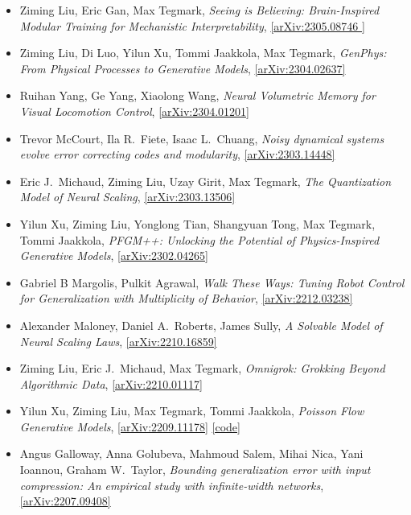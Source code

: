 \begin{itemize}
\item Ziming Liu, Eric Gan, Max Tegmark, \textit{Seeing is Believing: Brain-Inspired Modular Training for Mechanistic Interpretability}, \href{https://arxiv.org/abs/2305.08746 }{[arXiv:2305.08746 ]} 
\item Ziming Liu, Di Luo, Yilun Xu, Tommi Jaakkola, Max Tegmark, \textit{GenPhys: From Physical Processes to Generative Models}, \href{https://arxiv.org/abs/2304.02637}{[arXiv:2304.02637]} 
\item Ruihan Yang, Ge Yang, Xiaolong Wang, \textit{Neural Volumetric Memory for Visual Locomotion Control}, \href{https://arxiv.org/abs/2304.01201}{[arXiv:2304.01201]} 
\item Trevor McCourt, Ila R.\  Fiete, Isaac L.\  Chuang, \textit{Noisy dynamical systems evolve error correcting codes and modularity}, \href{https://arxiv.org/abs/2303.14448}{[arXiv:2303.14448]} 
\item Eric J.\  Michaud, Ziming Liu, Uzay Girit, Max Tegmark, \textit{The Quantization Model of Neural Scaling}, \href{https://arxiv.org/abs/2303.13506}{[arXiv:2303.13506]} 
\item Yilun Xu, Ziming Liu, Yonglong Tian, Shangyuan Tong, Max Tegmark, Tommi Jaakkola, \textit{PFGM++: Unlocking the Potential of Physics-Inspired Generative Models}, \href{https://arxiv.org/abs/2302.04265}{[arXiv:2302.04265]} 
\item Gabriel B Margolis, Pulkit Agrawal, \textit{Walk These Ways: Tuning Robot Control for Generalization with Multiplicity of Behavior}, \href{https://arxiv.org/abs/2212.03238}{[arXiv:2212.03238]} 
\item Alexander Maloney, Daniel A.\  Roberts, James Sully, \textit{A Solvable Model of Neural Scaling Laws}, \href{https://arxiv.org/abs/2210.16859}{[arXiv:2210.16859]} 
\item Ziming Liu, Eric J.\  Michaud, Max Tegmark, \textit{Omnigrok: Grokking Beyond Algorithmic Data}, \href{https://arxiv.org/abs/2210.01117}{[arXiv:2210.01117]} 
\item Yilun Xu, Ziming Liu, Max Tegmark, Tommi Jaakkola, \textit{Poisson Flow Generative Models}, \href{https://arxiv.org/abs/2209.11178}{[arXiv:2209.11178]}  \href{https://github.com/Newbeeer/poisson_flow}{[code]} 
\item Angus Galloway, Anna Golubeva, Mahmoud Salem, Mihai Nica, Yani Ioannou, Graham W.\  Taylor, \textit{Bounding generalization error with input compression: An empirical study with infinite-width networks}, \href{https://arxiv.org/abs/2207.09408}{[arXiv:2207.09408]} 

\end{itemize}
